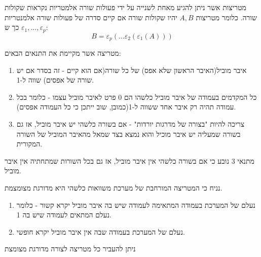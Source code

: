 \documentclass{tstextbook}
\begin{document}
\begin{definition}
מטריצות אשר ניתן להגיע מאחת לשנייה על ידי פעולות שורה אלמטריות נקראות שקולות שורה. כלומר מטריצות \(A,B\) יהיו שקולות שורה אם קיים סדרה של פעולות שורה אלמנטריות \(\varepsilon_{1},\dots,\varepsilon_{p}\) כך ש:
$$B=\varepsilon_{p}\left( \dots\varepsilon_{2}\left( \varepsilon_{1}(A) \right) \right)$$

\end{definition}
\begin{definition}
מטריצה אשר מקיימת את התנאים הבאים:

  \begin{enumerate}
    \item איבר מוביל(האיבר הראשון שלא אפס) של כל שורה(אם הוא קיים - זה בסדר אם יש שורה של אפסים) שווה ל-1. 


    \item כל המקדמים בעמודה של איבר מוביל כלשהו הם 0 פרט לאיבר מוביל עצמו - כלומר בכל עמודה תהיה רק איבר אחד ששווה ל-1(כמובן, שוב ייתכן כי כל העמודה אפסים). 


    \item צריכה להיות "בצורה של מדרגות יורדות" - אם בשורה כלשהי יש איבר מוביל, אז גם בשורה שמעליה יש איבר מוכיל והוא נמצא בצד שמאל מהאיבר המוביל של השורה המקורית. 


  \end{enumerate}
\end{definition}
\begin{remark}
מתנאי 3 נובע כי אם בשורה כלשהי אין איבר מוביל, אז גם בכל השורות שמתחתיה אין איבר מוביל.

\end{remark}
\begin{definition}
נניח כי המטריצה המורחבת של מערכת משוואות כלשהי היא מדורגת מצומצמת.

  \begin{enumerate}
    \item נעלם של המערכת בעמודה המתאימה לעמודה שיש בה איבר מוביל יקרא קשור - כלומר נעלם המתאים לעמודה שיש בה 1. 


    \item נעלם של המערכת בעמודה שבה אין איבר מוביל יקרא חופשי. 


  \end{enumerate}
\end{definition}
\begin{proposition}
ניתן להעביר כל מטריצה לצורה מדורגת מצומצת

\end{proposition}
\end{document}
